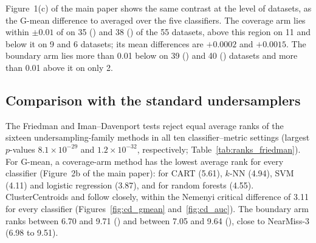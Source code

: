 Figure~1(c) of the main paper shows the same contrast at the level of datasets, as the G-mean difference to \RUS{} averaged over the five classifiers. The coverage arm lies within $\pm0.01$ of \RUS{} on 35 (\MUSCS) and 38 (\MUSCO) of the 55 datasets, above this region on 11 and below it on 9 and 6 datasets; its mean differences are $+0.0002$ and $+0.0015$. The boundary arm lies more than 0.01 below \RUS{} on 39 (\MUSBS) and 40 (\MUSBO) datasets and more than 0.01 above it on only 2.



\subsection{Comparison with the standard undersamplers}\label{sec:results:overall}

The Friedman and Iman--Davenport tests reject equal average ranks of the sixteen undersampling-family methods in all ten classifier--metric settings (largest $p$-values $8.1\times10^{-29}$ and $1.2\times10^{-32}$, respectively; Table~\ref{tab:ranks_friedman}). For G-mean, a coverage-arm method has the lowest average rank for every classifier (Figure~2b of the main paper): \MUSCO{} for CART (5.61), $k$-NN (4.94), SVM (4.11) and logistic regression (3.87), and \MUSCS{} for random forests (4.55). ClusterCentroids and \RUS{} follow closely, within the Nemenyi critical difference of 3.11 for every classifier (Figures~\ref{fig:cd_gmean} and~\ref{fig:cd_auc}). The boundary arm ranks between 6.70 and 9.71 (\MUSBS) and between 7.05 and 9.64 (\MUSBO), close to NearMiss-3 (6.98 to 9.51).

